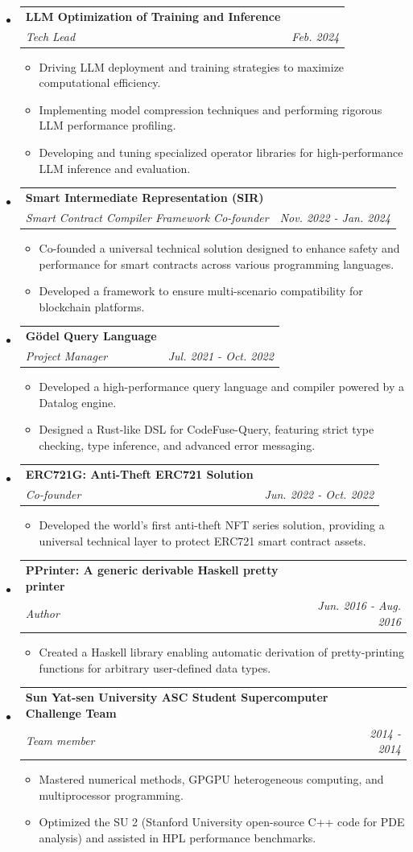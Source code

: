 \documentclass[letterpaper,11pt]{article}
\makeatletter
\newcommand{\resitem}[1]{\item #1 \vspace{-2pt}}
\newcommand{\ressubheading}[4]{
    \begin{tabular*}{6.5in}{p{4.8in}@{\extracolsep{\fill}}r}
            \textbf{#1} & #2 \\
            \textit{#3} & \textit{#4} \\
    \end{tabular*}\vspace{-8pt}}
\makeatother
\begin{document}
      \begin{itemize}
        \item \ressubheading{LLM Optimization of Training and Inference}{}{Tech Lead}{Feb. 2024}
        \begin{itemize}
            \resitem{Driving LLM deployment and training strategies to maximize computational efficiency.}
            \resitem{Implementing model compression techniques and performing rigorous LLM performance profiling.}
            \resitem{Developing and tuning specialized operator libraries for high-performance LLM inference and evaluation.}
        \end{itemize}
        \item \ressubheading{Smart Intermediate Representation (SIR)}{}{Smart Contract Compiler Framework Co-founder}{Nov. 2022 - Jan. 2024}
        \begin{itemize}
            \resitem{Co-founded a universal technical solution designed to enhance safety and performance for smart contracts across various programming languages.}
            \resitem{Developed a framework to ensure multi-scenario compatibility for blockchain platforms.}
        \end{itemize}
        \item \ressubheading{Gödel Query Language}{}{Project Manager}{Jul. 2021 - Oct. 2022}
        \begin{itemize}
            \resitem{Developed a high-performance query language and compiler powered by a Datalog engine.}
            \resitem{Designed a Rust-like DSL for CodeFuse-Query, featuring strict type checking, type inference, and advanced error messaging.}
        \end{itemize}
        \item \ressubheading{ERC721G: Anti-Theft ERC721 Solution}{}{Co-founder}{Jun. 2022 - Oct. 2022}
        \begin{itemize}
            \resitem{Developed the world's first anti-theft NFT series solution, providing a universal technical layer to protect ERC721 smart contract assets.}
        \end{itemize}
        \item \ressubheading{PPrinter: A generic derivable Haskell pretty printer}{}{Author}{Jun. 2016 - Aug. 2016}
        \begin{itemize}
            \resitem{Created a Haskell library enabling automatic derivation of pretty-printing functions for arbitrary user-defined data types.}
        \end{itemize}
        \item \ressubheading{Sun Yat-sen University ASC Student Supercomputer Challenge Team}{}{Team member}{2014 - 2014}
        \begin{itemize}
            \resitem{Mastered numerical methods, GPGPU heterogeneous computing, and multiprocessor programming.}
            \resitem{Optimized the SU 2 (Stanford University open-source C++ code for PDE analysis) and assisted in HPL performance benchmarks.}
        \end{itemize}
      \end{itemize}
\end{document}
